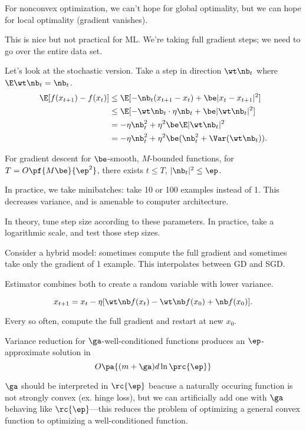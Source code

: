 For nonconvex optimization, we can't hope for global optimality, but we can hope for local optimality (gradient vanishes).

This is nice but not practical for ML. We're taking full gradient steps; we need to go over the entire data set.

Let's look at the stochastic version. Take a step in direction $\wt \nb_t$ where $\E \wt\nb_t=\nb_t$.
\begin{align}
\E[f(x_{t+1})-f(x_t)] 
&\le \E[-\nb_t(x_{t+1}-x_t) + \be |x_t-x_{t+1}|^2]\\
&\le \E[-\wt\nb_t\cdot \eta\nb_t + \be |\wt \nb_t|^2]\\
&=- \eta\nb_t^2 + \eta^2 \be \E|\wt\nb_t|^2\\
&=-\eta\nb_t^2 + \eta^2\be (\nb_t^2 + \Var(\wt\nb_t)).
\end{align}
\begin{thm}
For gradient descent for $\be$-smooth, $M$-bounded functions, for $T=O\pf{M\be}{\ep^2}$,  there exists $t\le T$, $|\nb_t|^2 \le \ep$.
\end{thm}

In practice, we take minibatches: take 10 or 100 examples instead of 1. This decreases variance, and is amenable to computer architecture.

In theory, tune step size according to these parameters. 
In practice, take a logarithmic scale, and test those step sizes.

Consider a hybrid model: sometimes compute the full gradient and %
sometimes take only the gradient of 1 example. This interpolates between GD and SGD.

Estimator combines both to create a random variable with lower variance. 
\begin{alg}[SVRG]
$$
x_{t+1} = x_t - \eta [\wt\nb f(x_t) - \wt\nb f(x_0)+\nb f(x_0)].
$$
\end{alg}
Every so often, compute the full gradient and restart at new $x_0$.
\begin{thm}
Variance reduction for $\ga$-well-conditioned functions produces an $\ep$-approximate solution in 
$$
O\pa{(m+\ga)d\ln \prc{\ep}}
$$
\end{thm}
$\ga$ should be interpreted in $\rc{\ep}$ beacuse a naturally occuring function is not strongly convex (ex. hinge loss), but we can artificially add one with $\ga$ behaving like $\rc{\ep}$---this reduces the problem of optimizing a general convex function to optimizing a well-conditioned function.

